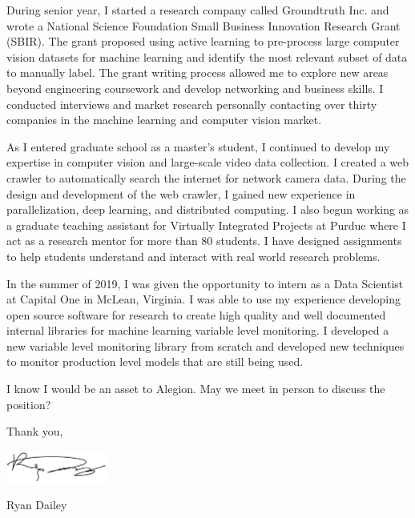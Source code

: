 \documentclass[10pt]{article}
\newlength{\cvaftersectionskipamount}
\newcommand{\company}{Alegion}
\newcommand{\job}{Machine Learning Software Engineer}
\begin{document}
During senior year, I started a research company called Groundtruth Inc. and wrote a National Science Foundation Small Business Innovation Research Grant (SBIR). The grant proposed using active learning to pre-process large computer vision datasets for machine learning and identify the most relevant subset of data to manually label. The grant writing process allowed me to explore new areas beyond engineering coursework and develop networking and business skills. I conducted interviews and market research personally contacting over thirty companies in the machine learning and computer vision market.  

As I entered graduate school as a master's student, I continued to develop my expertise in computer vision and large-scale video data collection. I created a web crawler to automatically search the internet for network camera data. During the design and development of the web crawler, I gained new experience in parallelization, deep learning, and distributed computing. I also begun working as a graduate teaching assistant for Virtually Integrated Projects at Purdue where I act as a research mentor for more than 80 students. I have designed assignments to help students understand and interact with real world research problems. 

In the summer of 2019, I was given the opportunity to intern as a Data Scientist at Capital One in McLean, Virginia. I was able to use my experience developing open source software for research to create high quality and well documented internal libraries for machine learning variable level monitoring. I developed a new variable level monitoring library from scratch and developed new techniques to monitor production level models that are still being used.  

\vspace{\cvaftersectionskipamount}

\noindent I know I would be an asset to \company. 
May we meet in person to discuss the position?  

\vspace{2\cvaftersectionskipamount}

\noindent Thank you, 

\vspace{\cvaftersectionskipamount}

\includegraphics[height=30pt]{Signature.pdf}

Ryan Dailey 
\end{document}
